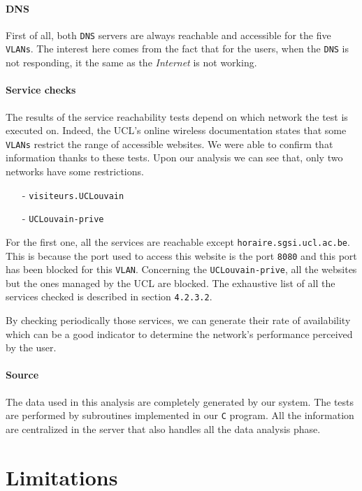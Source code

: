 \paragraph*{DNS} First of all, both \texttt{DNS} servers are always reachable and accessible for the five \texttt{VLANs}. The interest here comes from the fact that for the users, when the \texttt{DNS} is not responding, it the same as the \emph{Internet} is not working. 

\paragraph*{Service checks} The results of the service reachability tests depend on which network the test is executed on. Indeed, the UCL's online wireless documentation states that some \texttt{VLANs} restrict the range of accessible websites. We were able to confirm that information thanks to these tests. Upon our analysis we can see that, only two networks have some restrictions.

\begin{itemize}
	\item [-] \texttt{visiteurs.UCLouvain}
	\item [-] \texttt{UCLouvain-prive}
\end{itemize}

For the first one, all the services are reachable except \texttt{horaire.sgsi.ucl.ac.be}. This is because the port used to access this website is the port \texttt{8080} and this port has been blocked for this \texttt{VLAN}. Concerning the \texttt{UCLouvain-prive}, all the websites but the ones managed by the UCL are blocked. The exhaustive list of all the services checked is described in section \texttt{4.2.3.2}.

By checking periodically those services, we can generate their rate of availability which can be a good indicator to determine the network's performance perceived by the user.


\paragraph*{Source} The data used in this analysis are completely generated by our system. The tests are performed by subroutines implemented in our \texttt{C} program. All the information are centralized in the server that also handles all the data analysis phase.

\section{Limitations}


